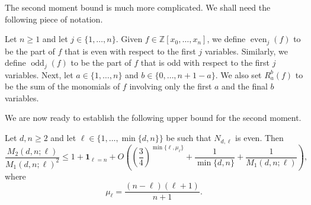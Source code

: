 \documentclass[11pt, reqno]{amsart}
\numberwithin{equation}{section}
\newcommand{\ZZ}{\mathbb{Z}}
\DeclareMathOperator{\even}{even}
\DeclareMathOperator{\odd}{odd}
\renewcommand{\leq}{\leqslant}
\renewcommand{\geq}{\geqslant}
\begin{document}
The  second moment bound is much more complicated. We shall need  the following piece of notation. 
\begin{definition}\label{def-f'}
Let $n\geq 1$
and let $j\in \{1,\dots,n\}.$
Given $f\in \ZZ[x_0,\dots,x_n]$, we define  $\even_j(f)$ to be the part of $f$ that is 
even with  respect to the first $j$ variables. Similarly, we define 
$\odd_j(f)$ to be the part of $f$ that is  odd  with respect to the first $j$ variables. 
Next, let 
$a\in \{1,\dots,n\}$ and  $b\in \{0,\dots,n+1-a\}$.
We also set $R_a^b(f)$ to be the sum of the monomials of $f$ involving only the first $a$ and the final $b$ variables.
\end{definition}

We are now ready to establish the following  upper bound for the second moment.

\begin{lemma}
\label{Lemma second moment}
Let $d, n \geq 2$ and let $\ell \in \{1, \dots, \min\{d,n\}\}$ be such that $N_{d,\ell}$ is even. Then 
\begin{equation*}
\frac{M_2(d,n;\ell)}{M_1(d,n;\ell)^2} \leq 
1 + \boldsymbol{1}_{\ell=n} + O \left( \left(\frac{3}{4}\right)^{\min\{\ell,\mu_\ell\}}+\frac1{\min\{d,n\}}+
 \frac1{M_1(d,n;\ell)}\right) ,
\end{equation*}
where
\begin{equation}\label{eq:soil}
\mu_\ell=\frac{(n-\ell)(\ell+1)}{n+1}.
\end{equation}
\end{lemma}
\end{document}
